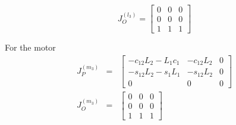 \documentclass{article}
\begin{document}
\begin{equation*}
	J_O^{(l_3)} = \begin{bmatrix}0 & 0 & 0 \\ 0 & 0 & 0 \\ 1 & 1 & 1 \end{bmatrix}
\end{equation*}

For the motor
\begin{eqnarray*}
	J_{P}^{(m_3)} &=& \begin{bmatrix}-c_{12}L_2 - L_1c_1 & -c_{12}L_2 & 0 \\ -s_{12}L_2 - s_1L_1 & -s_{12}L_2 & 0 \\ 0 & 0 & 0 \end{bmatrix}\\
	J_O^{(m_3)} &=& \begin{bmatrix}0 & 0 & 0 \\ 0 & 0 & 0 \\ 1 & 1 & 1 \end{bmatrix}
\end{eqnarray*}
\end{document}
